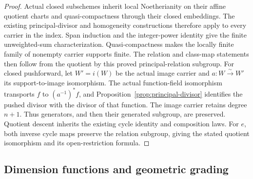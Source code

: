 \documentclass[11pt]{article}
\theoremstyle{definition}
\theoremstyle{remark}
\begin{document}
\begin{proof}
Actual closed subschemes inherit local Noetherianity on their affine
quotient charts and quasi-compactness through their closed embeddings.
The existing principal-divisor and homogeneity constructions therefore
apply to every carrier in the index. Span induction and the integer-power
identity give the finite unweighted-sum characterization. Quasi-compactness
makes the locally finite family of nonempty carrier supports finite.
The relation and class-map statements then follow from the quotient by
this proved principal-relation subgroup.
For closed pushforward, let \(W'=i(W)\) be the actual image carrier and
\(a:W\xrightarrow{\sim}W'\) its support-to-image isomorphism. The actual
function-field isomorphism transports \(f\) to \((a^{-1})^*f\), and
Proposition~\ref{prop:principal-divisor} identifies the pushed divisor
with the divisor of that function. The image carrier retains degree
\(n+1\). Thus generators, and then their generated subgroup, are
preserved. Quotient descent inherits the existing cycle identity and
composition laws. For \(e\), both inverse cycle maps preserve the
relation subgroup, giving the stated quotient isomorphism and its
open-restriction formula.
\end{proof}

\subsection{Dimension functions and geometric grading}
\label{app:dimensions}
\end{document}
